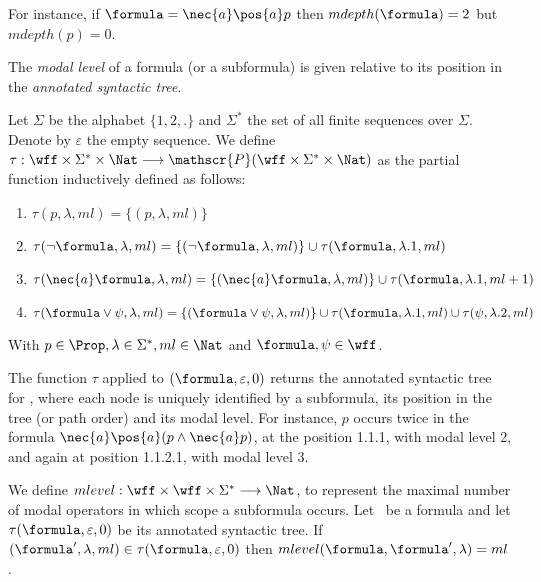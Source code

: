 For instance, if $\formula = \nec{a}\pos{a} p$ then $mdepth(\formula) = 2$ but $mdepth(p) = 0$.

The \emph{modal level} of a formula (or a subformula) is given relative to its position in the
\emph{annotated syntactic tree}.

\begin{definition}
    Let $\Sigma$ be the alphabet $\{1, 2, .\}$ and $\Sigma^*$ the set of all
    finite sequences over $\Sigma$. Denote by $\varepsilon$ the empty sequence.
    We define $\tau : \wff \times \Sigma^* \times \Nat \longrightarrow
    \mathscr{P}(\wff \times \Sigma^* \times \Nat)$ as the partial function
    inductively defined as follows:
    \begin{enumerate}
        \item $\tau(p, \lambda, ml) = \{(p, \lambda, ml)\}$
        \item $\tau(\neg \formula, \lambda, ml) = \{(\neg \formula, \lambda, ml)\} \cup \tau(\formula, \lambda.1, ml)$
        \item $\tau(\nec{a} \formula, \lambda, ml) = \{(\nec{a} \formula, \lambda, ml)\} \cup \tau(\formula, \lambda.1, ml + 1)$
        \item $\tau(\formula \lor \psi, \lambda, ml) = \{(\formula \lor \psi, \lambda, ml)\} \cup \tau(\formula, \lambda.1, ml) \cup \tau(\psi, \lambda.2, ml)$
    \end{enumerate}
    With $p \in \Prop, \lambda \in \Sigma^*, ml \in \Nat$ and $\formula, \psi
    \in \wff$.
\end{definition}

The function $\tau$ applied to $(\formula, \varepsilon, 0)$ returns the
annotated syntactic tree for \formula, where each node is uniquely identified by
a subformula, its position in the tree (or path order) and its modal level. For
instance, $p$ occurs twice in the formula $\nec{a}\pos{a}(p \land \nec{a} p)$,
at the position 1.1.1, with modal level 2, and again at position
1.1.2.1, with modal level 3.

\begin{definition}
    We define $mlevel : \wff \times \wff \times \Sigma^* \longrightarrow \Nat$,
    to represent the maximal number of modal operators in which scope a subformula
    occurs. Let \formula~be a formula and let $\tau(\formula, \varepsilon, 0)$
    be its annotated syntactic tree. If $(\formula', \lambda, ml)\in
    \tau(\formula, \varepsilon, 0)$ then $mlevel(\formula, \formula', \lambda) =
    ml$.
\end{definition}

